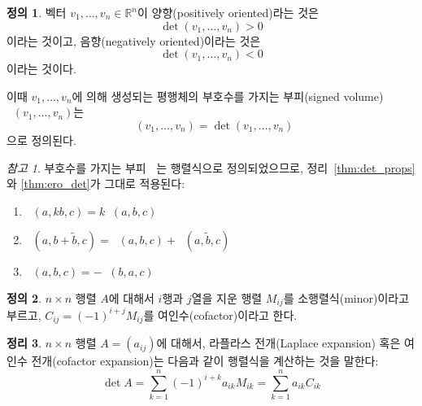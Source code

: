 \documentclass[unfonts,oneside,a4paper]{oblivoir}
\theoremstyle{definition}
\newtheorem{definition}{정의}[section]
\theoremstyle{theorem}
\newtheorem{theorem}[definition]{정리}
\theoremstyle{theorem}
\theoremstyle{remark}
\newtheorem*{remark}{참고}
\theoremstyle{remark}
\theoremstyle{remark}
\theoremstyle{remark}
\renewcommand{\vec}[1]{\bm{\mathit{#1}}}
\DeclareMathOperator{\sVol}{\widetilde{Vol}}
\begin{document}
\begin{definition}
    벡터 $\vec v_1, \dots, \vec v_n \in \mathbb R^n$이 양향(positively oriented)라는 것은
    \begin{equation*}
        \det(\vec v_1, \dots, \vec v_n) > 0
    \end{equation*}
    이라는 것이고, 음향(negatively oriented)이라는 것은
    \begin{equation*}
        \det(\vec v_1, \dots, \vec v_n) < 0
    \end{equation*}
    이라는 것이다.
    
    이때 $\vec v_1, \dots, \vec v_n$에 의해 생성되는 평행체의 부호수를 가지는 부피(signed volume) $\sVol(\vec v_1, \dots, \vec v_n)$는
    \begin{equation*}
        \sVol(\vec v_1, \dots, \vec v_n) = \det(\vec v_1, \dots, \vec v_n)
    \end{equation*}
    으로 정의된다.
\end{definition}

\begin{remark}
    부호수를 가지는 부피 $\sVol$는 행렬식으로 정의되었으므로, 정리~\ref{thm:det_props}와 \ref{thm:ero_det}가 그대로 적용된다:
    \begin{enumerate}
        \item $\sVol(\vec a, k \vec b, \vec c) = k \sVol(\vec a, \vec b, \vec c)$
        \item $\sVol(\vec a, \vec b + \tilde{\vec b}, \vec c) = \sVol(\vec a, \vec b, \vec c) + \sVol(\vec a, \tilde{\vec b}, \vec c)$
        \item $\sVol(\vec a, \vec b, \vec c) = -\sVol(\vec b, \vec a, \vec c)$
    \end{enumerate}
\end{remark}

\begin{definition}
    $n \times n$ 행렬 $A$에 대해서 $i$행과 $j$열을 지운 행렬 $M_{ij}$를 소행렬식(minor)이라고 부르고, $C_{ij} = (-1)^{i + j} M_{ij}$를 여인수(cofactor)이라고 한다.
\end{definition}

\begin{theorem}
    $n \times n$ 행렬 $A = (a_{ij})$에 대해서, 라플라스 전개(Laplace expansion) 혹은 여인수 전개(cofactor expansion)는 다음과 같이 행렬식을 계산하는 것을 말한다:
    \begin{equation*}
        \det A = \sum_{k = 1}^n (-1)^{i + k} a_{ik} M_{ik} = \sum_{k = 1}^n a_{ik} C_{ik}
    \end{equation*}
\end{theorem}
\end{document}
